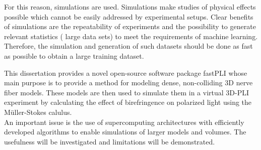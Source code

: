 % 
For this reason, simulations are used.
Simulations make studies of physical effects possible which cannot be easily addressed by experimental setups.
Clear benefits of simulations are the repeatability of experiments and the possibility to generate relevant statistics (\ie{} large data sets) to meet \eg{} the requirements of machine learning.
Therefore, the simulation and generation of such datasets should be done as fast as possible to obtain a large training dataset.
\cite{Ginsburger2018, ginsburgerDis2019, Callaghan2019, Menzel2020}
\par
%
This dissertation provides a novel open-source software package \ac{fastPLI} whose main purpose is to provide a method for modeling dense, non-colliding 3D nerve fiber models.
These models are then used to simulate them in a virtual \ac{3D-PLI} experiment by calculating the effect of birefringence on polarized light using the M\"{u}ller-Stokes calulus. \cite{Matuschke2019, Matuschke2021, Reuter2019}\\
An important issue is the use of supercomputing architectures with efficiently developed algorithms to enable simulations of larger models and volumes.
The usefulness will be investigated and limitations will be demonstrated.
